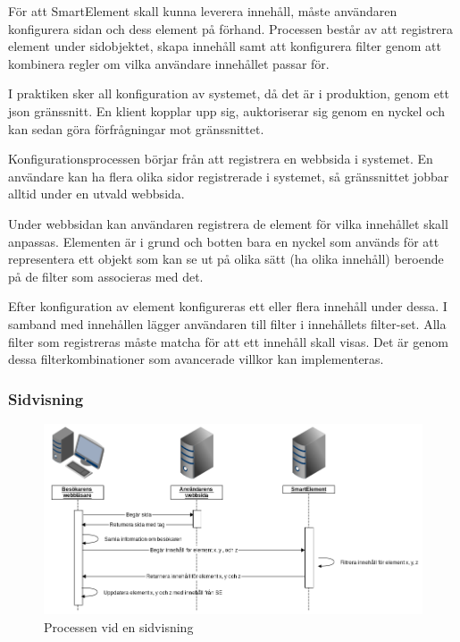 För att SmartElement skall kunna leverera innehåll, måste användaren konfigurera sidan och dess element på förhand. Processen består av att registrera element under sidobjektet, skapa innehåll samt att konfigurera filter genom att kombinera regler om vilka användare innehållet passar för.

I praktiken sker all konfiguration av systemet, då det är i produktion, genom ett \gls{json} gränssnitt. En klient kopplar upp sig, auktoriserar sig genom en nyckel och kan sedan göra förfrågningar mot gränssnittet.

Konfigurationsprocessen börjar från att registrera en webbsida i systemet. En användare kan ha flera olika sidor registrerade i systemet, så gränssnittet jobbar alltid under en utvald webbsida.

Under webbsidan kan användaren registrera de element för vilka innehållet skall anpassas. Elementen är i grund och botten bara en nyckel som används för att representera ett objekt som kan se ut på olika sätt (ha olika innehåll) beroende på de filter som associeras med det.

Efter konfiguration av element konfigureras ett eller flera innehåll under dessa. I samband med innehållen lägger användaren till filter i innehållets filter-set. Alla filter som registreras måste matcha för att ett innehåll skall visas. Det är genom dessa filterkombinationer som avancerade villkor kan implementeras.

\subsubsection{Sidvisning}

\begin{figure}[h!]
\centering
\includegraphics[width=150mm]{assets/images/smelementactivity.png}
\caption{Processen vid en sidvisning}
\label{pageviewprocess}
\end{figure}

